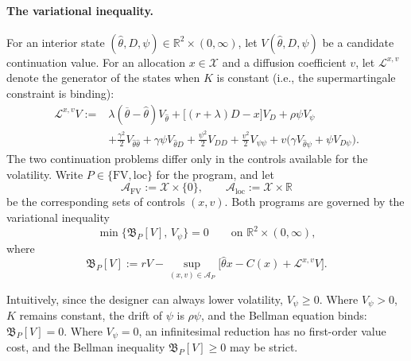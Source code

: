 \documentclass[12pt]{article}
\newcommand{\hth}{\hat\theta}
\begin{document}
\paragraph{The variational inequality.}
For an interior state
\((\hth,D,\psi)\in\mathbb R^2\times(0,\infty)\), let
\(V(\hth,D,\psi)\) be a candidate continuation value. For an allocation
\(x\in\mathcal X\) and a diffusion coefficient \(v\), let
\(\mathcal L^{x,v}\) denote the generator of the states when \(K\) is
constant (i.e., the supermartingale constraint is binding):
\begin{equation}\label{eq:generator}
\begin{aligned}
  \mathcal L^{x,v}V
  :={}&
  \lambda(\overline\theta-\hth)V_{\hth}
  +\bigl[(r+\lambda)D-x\bigr]V_D
  +\rho\psi V_\psi\\
  &+\frac{\gamma^2}{2}V_{\hth\hth}
  +\gamma\psi V_{\hth D}
  +\frac{\psi^2}{2}V_{DD}+\frac{v^2}{2}V_{\psi\psi}
  +v\bigl(
    \gamma V_{\hth\psi}
    +\psi V_{D\psi}
  \bigr).
\end{aligned}
\end{equation}
The two continuation problems differ only in the controls available for
the volatility. Write \(P\in\{\mathrm{FV},\mathrm{loc}\}\) for the
program, and let
\[
  \mathcal A_{\mathrm{FV}}:=\mathcal X\times\{0\},
  \qquad
  \mathcal A_{\mathrm{loc}}:=\mathcal X\times\mathbb R
\]
be the corresponding sets of controls \((x,v)\). Both programs are
governed by the variational inequality
\begin{equation}\label{eq:hjb}
  \min\bigl\{\mathfrak B_P[V],\,V_\psi\bigr\}=0
  \qquad\text{on }\mathbb R^2\times(0,\infty),
\end{equation}
where
\[
  \mathfrak B_P[V]
  :=
  rV-\sup_{(x,v)\in\mathcal A_P}
  \bigl[\hth x-C(x)+\mathcal L^{x,v}V\bigr].
\]

Intuitively, since the designer can always lower volatility,
\(V_\psi\geq0\). Where \(V_\psi>0\), \(K\) remains constant, the
drift of \(\psi\) is \(\rho\psi\), and the Bellman equation binds: $\mathfrak B_P[V]=0$.
Where \(V_\psi=0\), an infinitesimal reduction has no first-order
value cost, and the Bellman inequality $\mathfrak B_P[V]\geq 0$ may be strict.
\end{document}
